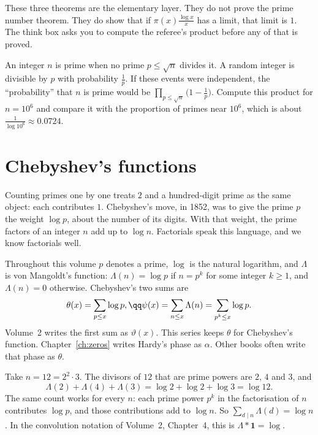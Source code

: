 These three theorems are the elementary layer. They do not prove the prime number theorem. They do show that if $\pi(x)\frac{\log x}x$ has a limit, that limit is $1$. The think box asks you to compute the referee's product before any of that is proved.


\begin{think}
An integer $n$ is prime when no prime $p\le\sqrt n$ divides it. A random integer is divisible by $p$ with probability $\frac1p$. If these events were independent, the ``probability'' that $n$ is prime would be $\prod_{p\le\sqrt n}\bigl(1-\frac1p\bigr)$. Compute this product for $n=10^6$ and compare it with the proportion of primes near $10^6$, which is about $\frac1{\log 10^6}\approx 0.0724$.
\end{think}

\section{Chebyshev's functions}

Counting primes one by one treats $2$ and a hundred-digit prime as the same object: each contributes $1$. Chebyshev's move, in 1852, was to give the prime $p$ the weight $\log p$, about the number of its digits. With that weight, the prime factors of an integer $n$ add up to $\log n$. Factorials speak this language, and we know factorials well.

Throughout this volume $p$ denotes a prime, $\log$ is the natural logarithm, and $\Lambda$ is von Mangoldt's function: $\Lambda(n)=\log p$ if $n=p^k$ for some integer $k\ge 1$, and $\Lambda(n)=0$ otherwise. Chebyshev's two sums are
\[
\begin{gathered}\theta(x)=\sum_{p\le x}\log p,\qq\psi(x)=\sum_{n\le x}\Lambda(n)=\sum_{p^k\le x}\log p.\end{gathered}
\]
Volume~2 writes the first sum as $\vartheta(x)$. This series keeps $\theta$ for Chebyshev's function. Chapter~\ref{ch:zeros} writes Hardy's phase as $\alpha$. Other books often write that phase as $\theta$.

Take $n=12=2^2\cdot 3$. The divisors of $12$ that are prime powers are $2$, $4$ and $3$, and
\[
\Lambda(2)+\Lambda(4)+\Lambda(3)=\log 2+\log 2+\log 3=\log 12.
\]
The same count works for every $n$: each prime power $p^k$ in the factorisation of $n$ contributes $\log p$, and those contributions add to $\log n$. So $\sum_{d\mid n}\Lambda(d)=\log n$. In the convolution notation of Volume~2, Chapter~4, this is $\Lambda*\mathbf 1=\log$.

